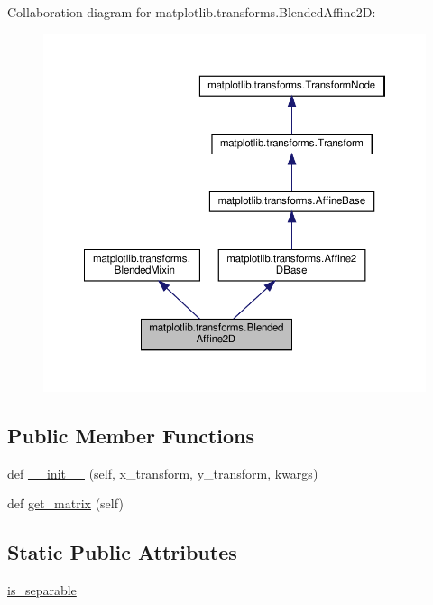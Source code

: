 Collaboration diagram for matplotlib.\+transforms.\+Blended\+Affine2D\+:
\nopagebreak
\begin{figure}[H]
\begin{center}
\leavevmode
\includegraphics[width=350pt]{classmatplotlib_1_1transforms_1_1BlendedAffine2D__coll__graph}
\end{center}
\end{figure}
\subsection*{Public Member Functions}
\begin{DoxyCompactItemize}
\item 
def \hyperlink{classmatplotlib_1_1transforms_1_1BlendedAffine2D_aed2da8d23d9c632cd576d17618b8c296}{\+\_\+\+\_\+init\+\_\+\+\_\+} (self, x\+\_\+transform, y\+\_\+transform, kwargs)
\item 
def \hyperlink{classmatplotlib_1_1transforms_1_1BlendedAffine2D_a0bf024301aeb795be31d3c709e8ae8b2}{get\+\_\+matrix} (self)
\end{DoxyCompactItemize}
\subsection*{Static Public Attributes}
\begin{DoxyCompactItemize}
\item 
\hyperlink{classmatplotlib_1_1transforms_1_1BlendedAffine2D_a6ffcad8f5288c0d1d9351114b576dea0}{is\+\_\+separable}
\end{DoxyCompactItemize}


